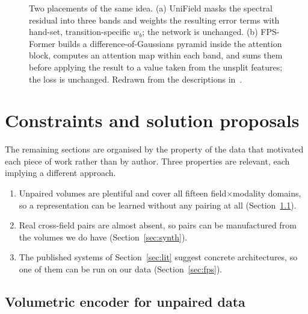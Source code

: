 \documentclass[11pt,a4paper]{article}
\begin{document}
\begin{figure}[H]
{}
  \caption{Two placements of the same idea. (a) UniField masks the spectral residual into three bands and
  weights the resulting error terms with hand-set, transition-specific $w_b$; the network is unchanged.
  (b) FPS-Former builds a difference-of-Gaussians pyramid inside the attention block, computes an
  attention map within each band, and sums them before applying the result to a value taken from the
  unsplit features; the loss is unchanged. Redrawn from the descriptions
  in~\cite{lin2026unifield,meng2025fpsformer}.}
  \label{fig:bands}
\end{figure}

\section{Constraints and solution proposals}
\label{sec:three}

The remaining sections are organised by the property of the data that motivated each piece of work
rather than by author. Three properties are relevant, each implying a different approach.

\begin{enumerate}
  \item Unpaired volumes are plentiful and cover all fifteen field$\times$modality domains, so a
  representation can be learned without any pairing at all (Section~\ref{sec:encoder}).
  \item Real cross-field pairs are almost absent, so pairs can be manufactured from the volumes we do
  have (Section~\ref{sec:synth}).
  \item The published systems of Section~\ref{sec:lit} suggest concrete architectures, so one of them can
  be run on our data (Section~\ref{sec:fps}).
\end{enumerate}

\subsection{Volumetric encoder for unpaired data}
\label{sec:encoder}
\end{document}
